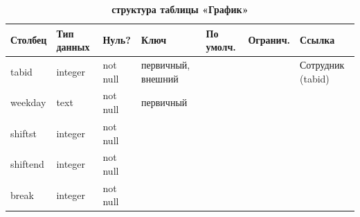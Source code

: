 \documentclass[14pt,a4paper,russian]{extreport}
\begin{document}
\begin{table}[h]
    \caption{ } 
    \begin{subtable}[t]{\textwidth}
        \caption{\textbf{структура таблицы «График»}}
    \begin{tabularx}{\textwidth}{| X | X | X | X | X | X | X |}
        \hline
        \textbf{Столбец} & \textbf{Тип данных} & \textbf{Нуль?} & \textbf{Ключ} & \textbf{По
        умолч.} & \textbf{Огранич.} & \textbf{Ссылка} \\ \hline
        tabid & integer & not null & первичный, внешний & & & Сотрудник (tabid) \\ \hline
        weekday & text & not null & первичный & & & \\ \hline
        shiftst & integer & not null & & & & \\ \hline
        shiftend & integer & not null & & & & \\ \hline
        break & integer & not null & & & & \\ \hline
    \end{tabularx}
    \end{subtable}
    \label{table:timetable}
\end{table}
\end{document}
